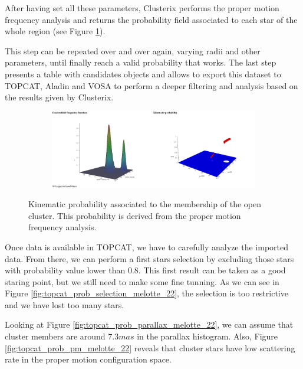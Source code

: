 \documentclass[11pt, a4paper, english]{book}
\begin{document}
After having set all these parameters, Clusterix performs the proper motion frequency analysis and returns the probability field
associated to each star of the whole region (see Figure \ref{fig:clusterix_probability_melotte_22}).

This step can be repeated over and over again, varying radii and other parameters, until finally reach a valid probability that works.
The last step presents a table with candidates objects and allows to export this dataset to TOPCAT,
Aladin and VOSA to perform a deeper filtering and analysis based on the results given by Clusterix.

\begin{figure}[htbp]
  \centering
  \begin{subfigure}{0.9\textwidth}
    \centering
    \includegraphics[width=\textwidth]{../figures/clusterix/clusterix_probability_melotte_22.pdf}
  \end{subfigure}
  \caption{Kinematic probability associated to the membership of the open cluster.
           This probability is derived from the proper motion frequency analysis.}
  \label{fig:clusterix_probability_melotte_22}
\end{figure}

Once data is available in TOPCAT, we have to carefully analyze the imported data.
From there, we can perform a first stars selection by excluding those stars with probability value lower than 0.8.
This first result can be taken as a good staring point, but we still need to make some fine tunning.
As we can see in Figure \ref{fig:topcat_prob_selection_melotte_22}, the selection is too restrictive and we have lost too many stars.

Looking at Figure \ref{fig:topcat_prob_parallax_melotte_22}, we can assume that cluster members are around $7.3mas$ in the parallax histogram.
Also, Figure \ref{fig:topcat_prob_pm_melotte_22} reveals that cluster stars have low scattering rate in the proper motion configuration space.
\end{document}

